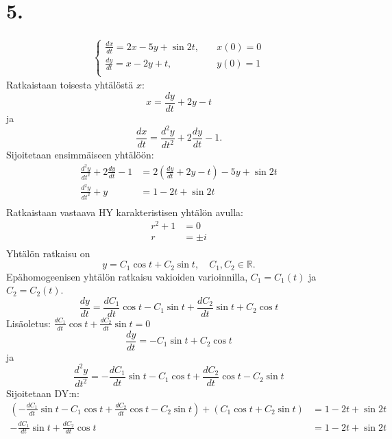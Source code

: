 \documentclass{article}
\begin{document}
\section*{5.}

\begin{align*}
  \begin{cases}
    \frac{dx}{dt} = 2x - 5y + \sin 2t, \quad & x(0) = 0 \\
    \frac{dy}{dt} = x - 2y + t, & y(0) = 1 \\
  \end{cases}
\end{align*}
Ratkaistaan toisesta yhtälöstä $x$:
\[
  x = \frac{dy}{dt} + 2y - t
\]
ja
\[
  \frac{dx}{dt} = \frac{d^2 y}{d t^2} + 2\frac{dy}{dt} - 1.
\]
Sijoitetaan ensimmäiseen yhtälöön:
\begin{align*}
  \frac{d^2 y}{d t^2} + 2\frac{dy}{dt} - 1 &= 2(\frac{dy}{dt} + 2y - t) - 5y + \sin 2t \\
  \frac{d^2 y}{d t^2} + y &= 1 - 2t + \sin 2t \\
\end{align*}
Ratkaistaan vastaava HY karakteristisen yhtälön avulla:
\begin{align*}
  r^2 + 1 &= 0 \\
  r &= \pm i \\
\end{align*}
Yhtälön ratkaisu on
\[
  y = C_1\cos t + C_2\sin t, \quad C_1,C_2 \in \mathbb{R}.
\]
Epähomogeenisen yhtälön ratkaisu vakioiden varioinnilla,
$C_1 = C_1(t)$ ja $C_2 = C_2(t)$.
\[
  \frac{dy}{dt} = \frac{dC_1}{dt}\cos t - C_1\sin t + \frac{dC_2}{dt}\sin t + C_2\cos t
\]
Lisäoletus: $\frac{dC_1}{dt}\cos t + \frac{dC_2}{dt}\sin t = 0$
\[
  \frac{dy}{dt} = -C_1\sin t + C_2\cos t
\]
ja
\[
  \frac{d^2 y}{d t^2} = -\frac{dC_1}{dt}\sin t - C_1\cos t + \frac{dC_2}{dt}\cos t - C_2\sin t
\]
Sijoitetaan DY:n:
\begin{align*}
  (-\frac{dC_1}{dt}\sin t - C_1\cos t + \frac{dC_2}{dt}\cos t - C_2\sin t)
  + (C_1\cos t + C_2\sin t) &= 1 - 2t + \sin 2t \\
  -\frac{dC_1}{dt}\sin t + \frac{dC_2}{dt}\cos t &= 1 - 2t + \sin 2t \\
\end{align*}
\end{document}
